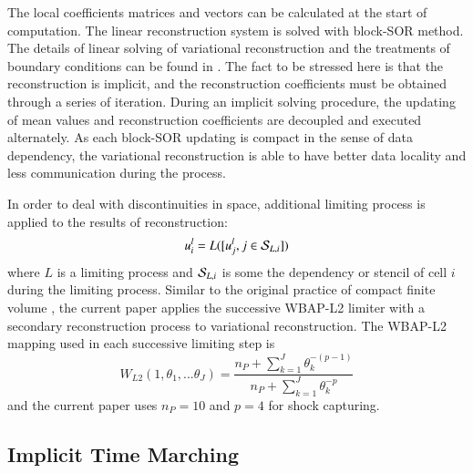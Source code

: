 The local coefficients matrices and vectors  can be
calculated at the start of computation.
The linear reconstruction system  is solved with block-SOR method.
The details of linear solving of variational reconstruction and the treatments of
boundary conditions can be found in \cite{wang2017compact_VR}.
The fact to be stressed here is that the reconstruction is implicit, and
the reconstruction coefficients must be obtained through a series of
iteration.
During an implicit solving procedure,
the updating of mean values and reconstruction coefficients are decoupled
and executed alternately.
As each block-SOR updating is compact in the sense of data dependency,
the variational reconstruction is able to have better data locality and
less communication during the process.

In order to deal with discontinuities in space, additional limiting
process is applied to the results of reconstruction:
\begin{equation}
    u_i^l = L([u_j^l, j\in \mathcal{S}_{L,i}])
\end{equation}
where $L$ is a limiting process and $\mathcal{S}_{L,i}$ is some
the dependency or stencil of cell $i$ during the limiting process.
Similar to the original practice of compact finite volume \cite{wang2016compact1_VR},
the current paper applies the
successive WBAP-L2 limiter \cite{li2011multi,li2012multi}
with a secondary reconstruction process \cite{li2012high} to variational
reconstruction.
The WBAP-L2 mapping used in each successive limiting step
is
\begin{equation}
    W_{L2} (1,\theta_1,...\theta_J) =
    \frac{n_P + \sum_{k=1}^J\theta_k^{-(p-1)} }
    {n_P + \sum_{k=1}^J\theta_k^{-p}}
\end{equation}
and the current paper uses $n_P = 10$ and $p=4$ for shock capturing.

\subsection{Implicit Time Marching}

